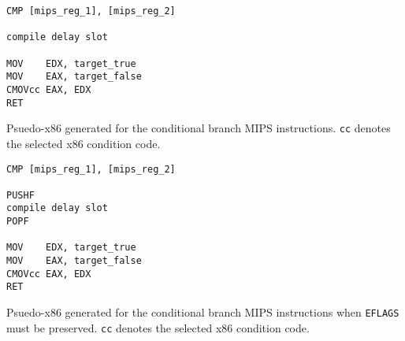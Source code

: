 \begin{lstfloat}[H]
    \begin{lstlisting}
CMP [mips_reg_1], [mips_reg_2]

compile delay slot

MOV    EDX, target_true
MOV    EAX, target_false
CMOVcc EAX, EDX
RET
    \end{lstlisting}
    \caption{Psuedo-x86 generated for the conditional branch MIPS instructions. \texttt{cc} denotes the selected x86 condition code.}
    \label{code:branch-x86-branch}
\end{lstfloat}

\begin{lstfloat}[H]
    \begin{lstlisting}
CMP [mips_reg_1], [mips_reg_2]

PUSHF
compile delay slot
POPF

MOV    EDX, target_true
MOV    EAX, target_false
CMOVcc EAX, EDX
RET
    \end{lstlisting}
    \caption{Psuedo-x86 generated for the conditional branch MIPS instructions when \texttt{EFLAGS} must be preserved. \texttt{cc} denotes the selected x86 condition code.}
    \label{code:branch-x86-branch-stack}
\end{lstfloat}
